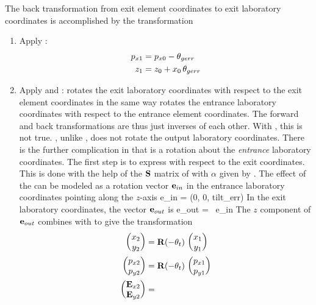 The back transformation from exit element coordinates to exit
laboratory coordinates is accomplished by the transformation
  \begin{enumerate}
  \item
Apply :
\begin{align}
  p_{x1} &= p_{x0} - \theta_{gerr} \nonumber \\
  z_1    &= z_0 + x_0 \, \theta_{gerr} 
\end{align}
  \item
Apply  and :  rotates the exit
laboratory coordinates with respect to the exit element coordinates in
the same way  rotates the entrance laboratory coordinates
with respect to the entrance element coordinates. The forward and back
transformations are thus just inverses of each other.  With
, this is not true. , unlike , does
not rotate the output laboratory coordinates.  There is the further
complication in that  is a rotation about the {\em
entrance} laboratory coordinates. The first step is to express
 with respect to the exit coordinates. This is done with
the help of the ${{\bf S}}$ matrix of  with $\alpha$ given by
. The effect of the  can be modeled as a rotation
vector ${\bf e}_{in}$ in the entrance laboratory coordinates pointing
along the $z$-axis
\Begineq
 \Bf e_{in} = (0, 0, \mbox{tilt_err})
\Endeq
In the exit laboratory coordinates, the vector ${\bf e}_{out}$ is
\Begineq
  \Bf e_{out} = \bS \, \Bf e_{in}
\Endeq
The $z$ component of ${\bf e}_{out}$ combines with  to give
the transformation
\begin{align}
  \begin{pmatrix} x_2 \\ y_2 \end{pmatrix} &=
    \bR (-\theta_{t}) \,   \begin{pmatrix} x_1 \\ y_1 \end{pmatrix} \CRNO
  \begin{pmatrix} p_{x2} \\ p_{y2} \end{pmatrix} &=
    \bR (-\theta_{t}) \,   \begin{pmatrix} p_{x1} \\ p_{y1} \end{pmatrix} \\
  \begin{pmatrix} \bE_{x2} \\ \bE_{y2} \end{pmatrix} &=

\end{align}
\end{enumerate}
